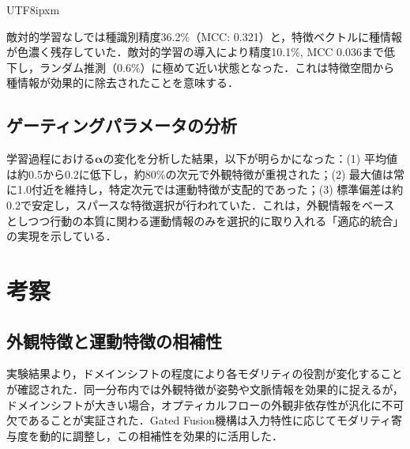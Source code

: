 \documentclass[twocolumn]{svjour3}
\begin{document}
\begin{CJK}{UTF8}{ipxm}
\begin{table}[t]
  \caption{種識別器による分類精度の比較}
  \label{tab:species_acc}
\end{table}

敵対的学習なしでは種識別精度36.2\%（MCC: 0.321）と，特徴ベクトルに種情報が色濃く残存していた．敵対的学習の導入により精度10.1\%, MCC 0.036まで低下し，ランダム推測（0.6\%）に極めて近い状態となった．これは特徴空間から種情報が効果的に除去されたことを意味する．

\subsection{ゲーティングパラメータの分析}

学習過程における$\boldsymbol{\alpha}$の変化を分析した結果，以下が明らかになった：(1) 平均値は約0.5から0.2に低下し，約80\%の次元で外観特徴が重視された；(2) 最大値は常に1.0付近を維持し，特定次元では運動特徴が支配的であった；(3) 標準偏差は約0.2で安定し，スパースな特徴選択が行われていた．これは，外観情報をベースとしつつ行動の本質に関わる運動情報のみを選択的に取り入れる「適応的統合」の実現を示している．

\section{考察}
\label{sec:discussion}

\subsection{外観特徴と運動特徴の相補性}

実験結果より，ドメインシフトの程度により各モダリティの役割が変化することが確認された．同一分布内では外観特徴が姿勢や文脈情報を効果的に捉えるが，ドメインシフトが大きい場合，オプティカルフローの外観非依存性が汎化に不可欠であることが実証された．Gated Fusion機構は入力特性に応じてモダリティ寄与度を動的に調整し，この相補性を効果的に活用した．


\end{CJK}
\end{document}
